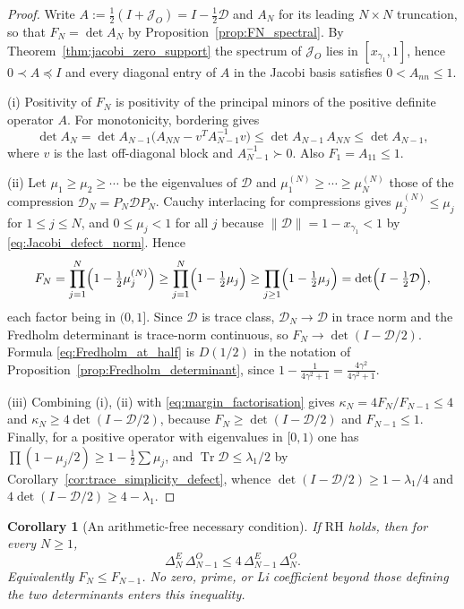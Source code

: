 \documentclass[preprint,12pt]{elsarticle}
\numberwithin{equation}{section}
\theoremstyle{plain}
\newtheorem{corollary}[theorem]{Corollary}
\theoremstyle{definition}
\theoremstyle{remark}
\newcommand{\RH}{\mathrm{RH}}
\newcommand{\Tr}{\operatorname{Tr}}
\begin{document}
\begin{proof}
Write $A:=\tfrac12(I+\mathcal J_O)=I-\tfrac12\mathcal D$ and $A_N$ for its leading $N\times N$
truncation, so that $F_N=\det A_N$ by Proposition~\ref{prop:FN_spectral}.  By
Theorem~\ref{thm:jacobi_zero_support} the spectrum of $\mathcal J_O$ lies in
$[x_{\gamma_1},1]$, hence $0\prec A\preceq I$ and every diagonal entry of $A$ in the
Jacobi basis satisfies $0<A_{nn}\le1$.

(i) Positivity of $F_N$ is positivity of the principal minors of the positive definite
operator $A$.  For monotonicity, bordering gives
\begin{equation}
 \det A_N=\det A_{N-1}\bigl(A_{NN}-v^TA_{N-1}^{-1}v\bigr)\le \det A_{N-1}\,A_{NN}
 \le\det A_{N-1},
\end{equation}
where $v$ is the last off-diagonal block and $A_{N-1}^{-1}\succ0$.  Also $F_1=A_{11}\le1$.

(ii) Let $\mu_1\ge\mu_2\ge\cdots$ be the eigenvalues of $\mathcal D$ and
$\mu_1^{(N)}\ge\cdots\ge\mu_N^{(N)}$ those of the compression
$\mathcal D_N=P_N\mathcal D P_N$.  Cauchy interlacing for compressions gives
$\mu_j^{(N)}\le\mu_j$ for $1\le j\le N$, and $0\le\mu_j<1$ for all $j$ because
$\|\mathcal D\|=1-x_{\gamma_1}<1$ by \eqref{eq:Jacobi_defect_norm}.  Hence
\begin{equation}
 F_N=\prod_{j=1}^{N}\Bigl(1-\tfrac12\mu_j^{(N)}\Bigr)
 \ge\prod_{j=1}^{N}\Bigl(1-\tfrac12\mu_j\Bigr)
 \ge\prod_{j\ge1}\Bigl(1-\tfrac12\mu_j\Bigr)
 =\det\Bigl(I-\tfrac12\mathcal D\Bigr),
\end{equation}
each factor being in $(0,1]$.  Since $\mathcal D$ is trace class, $\mathcal D_N\to\mathcal D$ in trace
norm and the Fredholm determinant is trace-norm continuous, so $F_N\to\det(I-\mathcal D/2)$.
Formula \eqref{eq:Fredholm_at_half} is $D(1/2)$ in the notation of
Proposition~\ref{prop:Fredholm_determinant}, since
$1-\tfrac{1}{4\gamma^2+1}=\tfrac{4\gamma^2}{4\gamma^2+1}$.

(iii) Combining (i), (ii) with \eqref{eq:margin_factorisation} gives
$\kappa_N=4F_N/F_{N-1}\le4$ and $\kappa_N\ge4\det(I-\mathcal D/2)$, because
$F_N\ge\det(I-\mathcal D/2)$ and $F_{N-1}\le1$.  Finally, for a positive operator with
eigenvalues in $[0,1)$ one has $\prod(1-\mu_j/2)\ge1-\tfrac12\sum\mu_j$, and
$\Tr\mathcal D\le\lambda_1/2$ by Corollary~\ref{cor:trace_simplicity_defect}, whence
$\det(I-\mathcal D/2)\ge1-\lambda_1/4$ and $4\det(I-\mathcal D/2)\ge4-\lambda_1$.
\end{proof}

\begin{corollary}[An arithmetic-free necessary condition]
\label{cor:kappa_le_4}
If $\RH$ holds, then for every $N\ge1$,
\[
\Delta_N^E\,\Delta_{N-1}^O
\le4\,\Delta_{N-1}^E\,\Delta_N^O.
\]
Equivalently $F_N\le F_{N-1}$.  No zero, prime, or Li coefficient beyond those defining the two
determinants enters this inequality.
\end{corollary}
\end{document}
